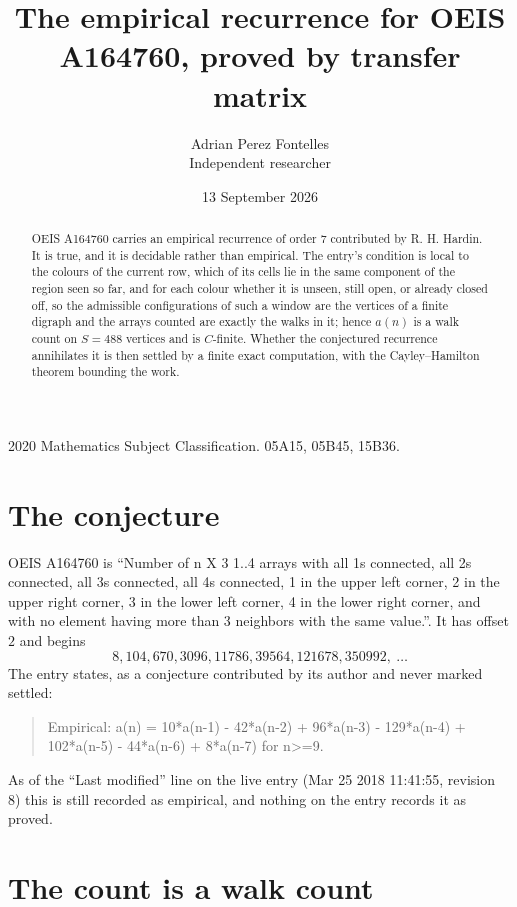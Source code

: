 \documentclass[11pt,a4paper]{article}
\title{The empirical recurrence for OEIS A164760, proved by transfer matrix}
\author{Adrian Perez Fontelles\\ \small Independent researcher}
\date{13 September 2026}
\theoremstyle{plain}
\theoremstyle{definition}
\begin{document}
\maketitle

\begin{abstract}
OEIS A164760 carries an empirical recurrence of order $7$ contributed by R. H. Hardin. It is
true, and it is decidable rather than empirical. The entry's condition is local to the colours of the current row, which of its cells lie in the same component of the region seen so far, and for each colour whether it is unseen, still open, or already closed off, so
the admissible configurations of such a window are the vertices of a finite digraph and the
arrays counted are exactly the walks in it; hence $a(n)$ is a walk count on $S=488$ vertices
and is $C$-finite. Whether the conjectured recurrence annihilates it is then settled by a
finite exact computation, with the Cayley--Hamilton theorem bounding the work.
\end{abstract}

\noindent\small 2020 Mathematics Subject Classification. 05A15, 05B45, 15B36.\normalsize

\section{The conjecture}

OEIS A164760 is ``Number of n X 3 1..4 arrays with all 1s connected, all 2s connected, all 3s connected, all 4s connected, 1 in the upper left corner, 2 in the upper right corner, 3 in the lower left corner, 4 in the lower right corner, and with no element having more than 3 neighbors with the same value.''. It has offset $2$ and begins
\[
8, 104, 670, 3096, 11786, 39564, 121678, 350992,\ \dots
\]
The entry states, as a conjecture contributed by its author and never marked settled:
\begin{quote}
Empirical: a(n) = 10*a(n-1) - 42*a(n-2) + 96*a(n-3) - 129*a(n-4) + 102*a(n-5) - 44*a(n-6) + 8*a(n-7) for n>=9.
\end{quote}
As of the ``Last modified'' line on the live entry (Mar 25 2018 11:41:55, revision 8) this is still
recorded as empirical, and nothing on the entry records it as proved.

\section{The count is a walk count}
\end{document}
